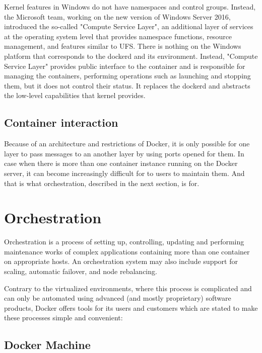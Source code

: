 Kernel features in Windows do not have namespaces and control groups.
Instead, the Microsoft team, working on the new version of Windows Server 2016,
introduced the
so-called "Compute Service Layer"\cite{DockerOnWindowsMicrosoftBlog},
an additional layer of services at the operating
system level that provides namespace functions, resource management,
and features similar to UFS.
There is nothing on the Windows platform that corresponds
to the dockerd and its environment.
Instead, "Compute Service Layer" provides public interface to the container
and is responsible for managing the containers, performing operations
such as launching and stopping them, but it does not control their status.
It replaces the dockerd and
abstracts the low-level capabilities that kernel provides.

\subsection{Container interaction}

Because of an architecture and restrictions of Docker, it is only possible for
one layer to pass messages to an another layer by using ports opened for them.
In case when there is more than one container
instance running on the Docker server, it can become increasingly difficult for
to users to maintain them. And that is what orchestration, described in the next
section, is for.

\section{Orchestration}

\begin{definition}
Orchestration is a process of setting up, controlling, updating
and performing maintenance works of complex applications containing more than
one container on appropriate hosts. An orchestration system may also include support for scaling,
automatic failover, and node rebalancing\cite{AdrMouOrchestration:2016}.
\end{definition}

Contrary to the virtualized environments, where this
process is complicated and can only be automated using advanced (and mostly
proprietary) software products, Docker offers tools for its users and customers
which are stated to make these processes simple and convenient:

\subsection{Docker Machine}


